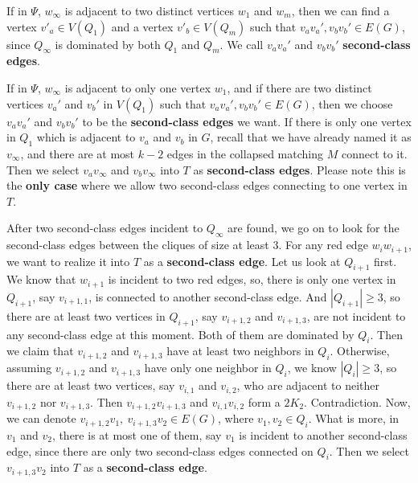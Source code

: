 \documentclass[12pt]{article}
\begin{document}
If in $\Psi$, $w_{\infty}$ is adjacent to two distinct vertices $w_1$ and $w_m$, then we can find a vertex $v'_a\in V(Q_1)$ and a vertex $v'_b\in V(Q_m)$ such that $v_av_a',v_bv_b'\in E(G)$, since $Q_{\infty}$ is dominated by both $Q_1$ and $Q_m$. We call $v_av_a'$ and $v_bv_b'$ {\bf second-class edges}.

If in $\Psi$, $w_{\infty}$ is adjacent to only one vertex $w_1$, and if there are two distinct vertices $v_a'$ and $v_b'$ in $V(Q_1)$ such that $v_av_a',v_bv_b'\in E(G)$, then we choose $v_av_a'$ and $v_bv_b'$ to be the {\bf second-class edges} we want. If there is only one vertex in $Q_1$ which is adjacent to $v_a$ and $v_b$ in $G$, recall that we have already named it as $v_{\infty}$, and there are at most $k-2$ edges in the collapsed matching $M$ connect to it. Then we select $v_av_{\infty}$ and $v_bv_{\infty}$ into $T$ as {\bf second-class edges}. Please note this is the {\bf only case} where we allow two second-class edges connecting to one vertex in $T$.





After two second-class edges incident to $Q_{\infty}$ are found, we go on to look for the second-class edges between the cliques of size at least 3.
For any red edge $w_iw_{i+1}$, we want to realize it into $T$ as a {\bf second-class edge}. Let us look at $Q_{i+1}$ first. We know that $w_{i+1}$ is incident to two red edges, so, there is only one vertex in $Q_{i+1}$, say $v_{i+1,1}$, is connected to another second-class edge. And $|Q_{i+1}|\ge3$, so there are at least two vertices in $Q_{i+1}$, say $v_{i+1,2}$ and $v_{i+1,3}$, are not incident to any second-class edge at this moment. Both of them are dominated by $Q_i$. Then we claim that $v_{i+1,2}$ and $v_{i+1,3}$ have at least two neighbors in $Q_i$. Otherwise, assuming $v_{i+1,2}$ and $v_{i+1,3}$ have only one neighbor in $Q_i$, we know $|Q_i|\ge3$, so there are at least two vertices, say $v_{i,1}$ and $v_{i,2}$, who are adjacent to neither $v_{i+1,2}$ nor $v_{i+1,3}$. Then $v_{i+1,2}v_{i+1,3}$ and $v_{i,1}v_{i,2}$ form a $2K_2$. Contradiction. Now, we can denote $v_{i+1,2}v_1,~v_{i+1,3}v_2\in E(G)$, where $v_1,v_2\in Q_i$. What is more, in $v_1$ and $v_2$, there is at most one of them, say $v_1$ is incident to another second-class edge, since there are only two second-class edges connected on $Q_i$. Then we select $v_{i+1,3}v_2$ into $T$ as a {\bf second-class edge}.
\end{document}
